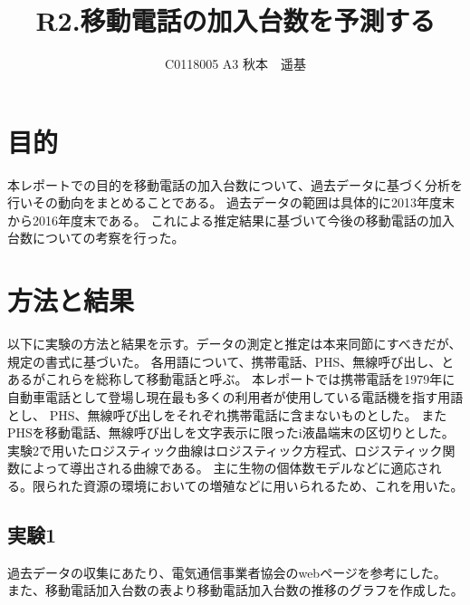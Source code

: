 \documentclass[uplatex, titlepage]{jsarticle}
\title{R2.移動電話の加入台数を予測する}
\author{C0118005 A3 秋本　遥基}
\date{}
\begin{document}
\maketitle

\section{目的}

   本レポートでの目的を移動電話の加入台数について、過去データに基づく分析を行いその動向をまとめることである。
過去データの範囲は具体的に2013年度末から2016年度末である。
これによる推定結果に基づいて今後の移動電話の加入台数についての考察を行った。

\section{方法と結果}

   以下に実験の方法と結果を示す。データの測定と推定は本来同節にすべきだが、規定の書式に基づいた。
各用語について、携帯電話、PHS、無線呼び出し、とあるがこれらを総称して移動電話と呼ぶ。
本レポートでは携帯電話を1979年に自動車電話として登場し現在最も多くの利用者が使用している電話機を指す用語とし、
PHS、無線呼び出しをそれぞれ携帯電話に含まないものとした。
またPHSを移動電話、無線呼び出しを文字表示に限ったi液晶端末の区切りとした。
実験2で用いたロジスティック曲線はロジスティック方程式、ロジスティック関数によって導出される曲線である。
主に生物の個体数モデルなどに適応される。限られた資源の環境においての増殖などに用いられるため、これを用いた。

\subsection{実験1}

   過去データの収集にあたり、電気通信事業者協会のwebページを参考にした。\cite{data}\\
また、移動電話加入台数の表より移動電話加入台数の推移のグラフを作成した。
\end{document}
